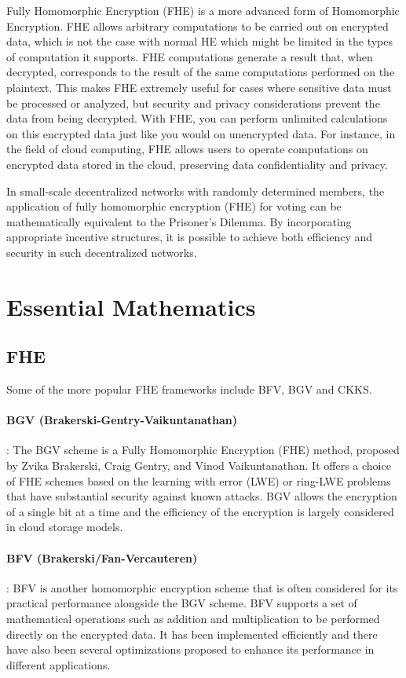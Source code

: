 \documentclass[11pt]{article}
\begin{document}
Fully Homomorphic Encryption (FHE) is a more advanced form of Homomorphic Encryption.
FHE allows arbitrary computations to be carried out on encrypted data, which is not the case with normal HE which might be limited in the types of computation it supports.
FHE computations generate a result that, when decrypted, corresponds to the result of the same computations performed on the plaintext.
This makes FHE extremely useful for cases where sensitive data must be processed or analyzed, but security and privacy considerations prevent the data from being decrypted.
With FHE, you can perform unlimited calculations on this encrypted data just like you would on unencrypted data. For instance, in the field of cloud computing, FHE allows users to operate computations on encrypted data stored in the cloud, preserving data confidentiality and privacy.

In small-scale decentralized networks with randomly determined members, the application of fully homomorphic encryption (FHE) for voting can be mathematically equivalent to the Prisoner's Dilemma. By incorporating appropriate incentive structures, it is possible to achieve both efficiency and security in such decentralized networks.

\section{Essential Mathematics}
\subsection{FHE}
Some of the more popular FHE frameworks include BFV, BGV and CKKS.

\paragraph{BGV (Brakerski-Gentry-Vaikuntanathan)}: The BGV scheme is a Fully Homomorphic Encryption (FHE) method, proposed by Zvika Brakerski, Craig Gentry, and Vinod Vaikuntanathan.
It offers a choice of FHE schemes based on the learning with error (LWE) or ring-LWE problems that have substantial security against known attacks.
BGV allows the encryption of a single bit at a time and the efficiency of the encryption is largely considered in cloud storage models.
\paragraph{BFV (Brakerski/Fan-Vercauteren)}: BFV is another homomorphic encryption scheme that is often considered for its practical performance alongside the BGV scheme.
BFV supports a set of mathematical operations such as addition and multiplication to be performed directly on the encrypted data.
It has been implemented efficiently and there have also been several optimizations proposed to enhance its performance in different applications.
\end{document}
